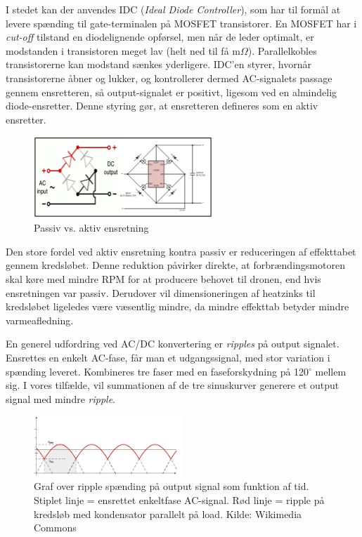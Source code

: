 I stedet kan der anvendes IDC (\textit{Ideal Diode Controller}), som har til formål at levere spænding til gate-terminalen på MOSFET transistorer. En MOSFET har i \textit{cut-off} tilstand en diodelignende opførsel, men når de leder optimalt, er modstanden i transistoren meget lav (helt ned til få m$\Omega$). Parallelkobles transistorerne kan modstand sænkes yderligere. IDC’en styrer, hvornår transistorerne åbner og lukker, og kontrollerer dermed AC-signalets passage gennem ensretteren, så output-signalet er positivt, ligesom ved en almindelig diode-ensretter. Denne styring gør, at ensretteren defineres som en aktiv ensretter.
\clearpage
\begin{figure}[h]
  \centering
  \includegraphics[width=0.6\textwidth]{./figurer/prens1.png}
  \caption{Passiv vs. aktiv ensretning}
  \label{fig:prens1}
\end{figure}

Den store fordel ved aktiv ensretning kontra passiv er reduceringen af effekttabet gennem kredsløbet. Denne reduktion påvirker direkte, at forbrændingsmotoren skal køre med mindre RPM for at producere behovet til dronen, end hvis ensretningen var passiv. Derudover vil dimensioneringen af heatzinks til kredsløbet ligeledes være væsentlig mindre, da mindre effekttab betyder mindre varmeafledning.  
  
En generel udfordring ved AC/DC konvertering er \textit{ripples} på output signalet. Ensrettes en enkelt AC-fase, får man et udgangssignal, med stor variation i spænding leveret. Kombineres tre faser med en faseforskydning på 120$^\circ$ mellem sig. I vores tilfælde, vil summationen af de tre sinuskurver generere et output signal med mindre \textit{ripple}.

\begin{figure}[h]
  \centering
  \includegraphics[width=0.5\textwidth]{./figurer/prens2.png}
  \caption{Graf over ripple spænding på output signal som funktion af tid. Stiplet linje = ensrettet enkeltfase
AC-signal. Rød linje = ripple på kredsløb med kondensator parallelt på load. Kilde: Wikimedia Commons}
  \label{fig:prens2}
\end{figure}

